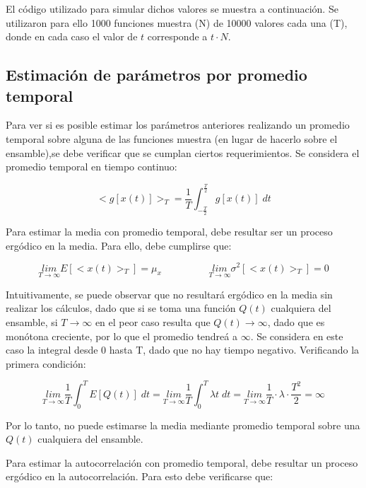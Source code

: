 El c\'odigo utilizado para simular dichos valores se muestra a continuaci\'on. Se utilizaron para ello 1000 funciones muestra (N) de 10000 valores cada una (T), donde en cada caso el valor de $t$ corresponde a $t \cdot N$.



\newpage

\subsection{Estimaci\'on de par\'ametros por promedio temporal}

Para ver si es posible estimar los par\'ametros anteriores realizando un promedio temporal sobre alguna de las funciones muestra (en lugar de hacerlo sobre el ensamble),se debe verificar que se cumplan ciertos requerimientos. Se considera el promedio temporal en tiempo continuo:

\[
<g[x(t)]>_T = \frac{1}{T} \int^{\frac{T}{2}}_{-\frac{T}{2}} g[x(t)] \; dt
\]

Para estimar la media con promedio temporal, debe resultar ser un proceso erg\'odico en la media. Para ello, debe cumplirse que:

\[
\underset{T \rightarrow \infty}{lim} E[<x(t)>_T] = \mu_x \hspace{2cm} \underset{T \rightarrow \infty}{lim} \sigma^2[<x(t)>_T] = 0
\]

Intuitivamente, se puede observar que no resultar\'a erg\'odico en la media sin realizar los c\'alculos, dado que si se toma una funci\'on $Q(t)$ cualquiera del ensamble, si $T \rightarrow \infty$ en el peor caso resulta que $Q(t) \rightarrow \infty$, dado que es mon\'otona creciente, por lo que el promedio tendre\'a a $\infty$. Se considera en este caso la integral desde 0 hasta T, dado que no hay tiempo negativo. Verificando la primera condici\'on:

\[
\underset{T \rightarrow \infty}{lim} \frac{1}{T} \int^{T}_{0} E[Q(t)] \; dt = \underset{T \rightarrow \infty}{lim} \frac{1}{T} \int^{T}_{0} \lambda t \; dt = \underset{T \rightarrow \infty}{lim} \frac{1}{T} \cdot \lambda \cdot \frac{T^2}{2} = \infty
\]

Por lo tanto, no puede estimarse la media mediante promedio temporal sobre una $Q(t)$ cualquiera del ensamble.\par
Para estimar la autocorrelaci\'on con promedio temporal, debe resultar un proceso erg\'odico en la autocorrelaci\'on. Para esto debe verificarse que:

